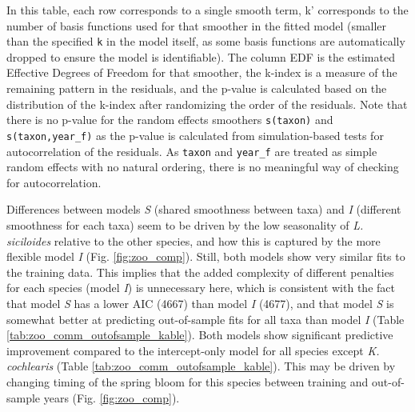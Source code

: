 \documentclass[12pt]{article}
\begin{document}
In this table, each row corresponds to a single smooth term, k'
corresponds to the number of basis functions used for that smoother in
the fitted model (smaller than the specified \texttt{k} in the model
itself, as some basis functions are automatically dropped to ensure the
model is identifiable). The column EDF is the estimated Effective
Degrees of Freedom for that smoother, the k-index is a measure of the
remaining pattern in the residuals, and the p-value is calculated based
on the distribution of the k-index after randomizing the order of the
residuals. Note that there is no p-value for the random effects
smoothers \texttt{s(taxon)} and \texttt{s(taxon,year\_f)} as the p-value
is calculated from simulation-based tests for autocorrelation of the
residuals. As \texttt{taxon} and \texttt{year\_f} are treated as simple
random effects with no natural ordering, there is no meaningful way of
checking for autocorrelation.

Differences between models \emph{S} (shared smoothness between taxa) and
\emph{I} (different smoothness for each taxa) seem to be driven by the
low seasonality of \emph{L. siciloides} relative to the other species,
and how this is captured by the more flexible model \emph{I} (Fig.
\ref{fig:zoo_comp}). Still, both models show very similar fits to the
training data. This implies that the added complexity of different
penalties for each species (model \emph{I}) is unnecessary here, which
is consistent with the fact that model \emph{S} has a lower AIC (4667)
than model \emph{I} (4677), and that model \emph{S} is somewhat better
at predicting out-of-sample fits for all taxa than model \emph{I} (Table
\ref{tab:zoo_comm_outofsample_kable}). Both models show significant
predictive improvement compared to the intercept-only model for all
species except \emph{K. cochlearis} (Table
\ref{tab:zoo_comm_outofsample_kable}). This may be driven by changing
timing of the spring bloom for this species between training and
out-of-sample years (Fig. \ref{fig:zoo_comp}).
\end{document}
